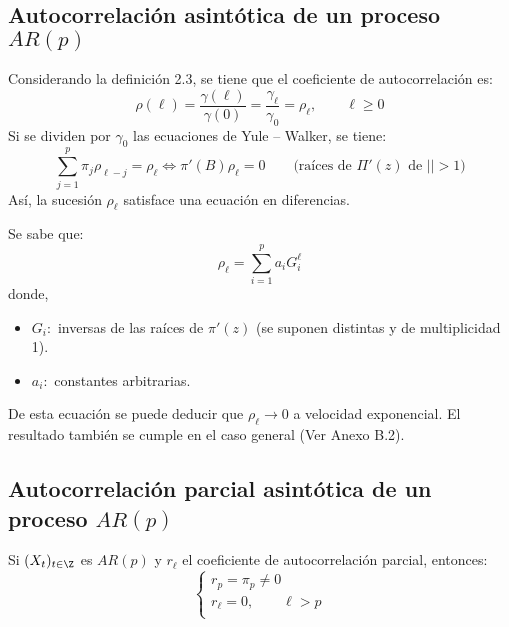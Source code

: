 \subsection{Autocorrelaci\'{o}n asint\'{o}tica de un proceso $AR(p)$}

Considerando la definici\'{o}n 2.3, se tiene que el coeficiente de autocorrelaci\'{o}n es:
\[
\rho \left( \ell \right)=\frac{\gamma (\ell)}{\gamma(0)}=\frac{\gamma_{\ell}}{\gamma_{0}}=\rho_{\ell}, \qquad  \ell\ge 0
\]
Si se dividen por $\gamma_{0} $ las ecuaciones de Yule -- Walker, se tiene:
\[
 \sum_{j=1}^p {\pi_{j} \rho_{\ell -j} =\rho_{\ell } \Leftrightarrow \pi'\left( B \right)\rho_{\ell } =0} \qquad \text{(ra\'{i}ces de $\Pi'(z)$ de $| |>1$)}
\]
As\'{i}, la sucesi\'{o}n $\rho_{\ell } $ satisface una ecuaci\'{o}n en diferencias.\newline

Se sabe que:
\[
\rho_{\ell } =\sum_{i=1}^p {a_{i} G_{i}^{\ell } } 
\]
donde, 
\begin{itemize}
 \item $G_{i} :$ inversas de las ra\'{i}ces de $\pi'\left( z \right)$ (se suponen distintas y de multiplicidad 1).
 \item $a_{i} :$ constantes arbitrarias.
\end{itemize}

De esta ecuaci\'{o}n se puede deducir que $\rho_{\ell } \to 0$ a velocidad exponencial. El resultado tambi\'{e}n se cumple en el caso general (Ver Anexo B.2).


\subsection{Autocorrelaci\'{o}n parcial asint\'{o}tica de un proceso $AR (p)$}

\begin{teorema}
Si $(X_{t} )_{t\in \Z} $ es $AR (p)$ y $r_{\ell }$ el coeficiente de autocorrelaci\'{o}n parcial, entonces:
\[
\left\{ {\begin{array}{l}
 r_{p} =\pi_{p} \ne 0 \\ 
 r_{\ell } =0,\qquad \ell >p \\ 
 \end{array}} \right.
\]
\end{teorema}

